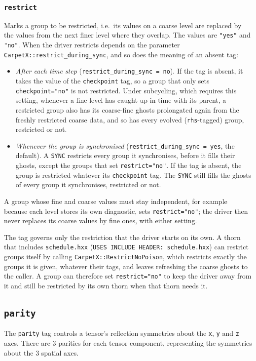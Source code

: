 \subsubsection{\texttt{restrict}}

Marks a group to be restricted, i.e.\ its values on a coarse level are replaced by the values from the next finer level where they overlap. The values are \texttt{"yes"} and \texttt{"no"}. When the driver restricts depends on the parameter \texttt{CarpetX::restrict\_during\_sync}, and so does the meaning of an absent tag:
%
\begin{itemize}
\item \emph{After each time step} (\texttt{restrict\_during\_sync = no}). If the tag is absent, it takes the value of the \texttt{checkpoint} tag, so a group that only sets \texttt{checkpoint="no"} is not restricted. Under subcycling, which requires this setting, whenever a fine level has caught up in time with its parent, a restricted group also has its coarse-fine ghosts prolongated again from the freshly restricted coarse data, and so has every evolved (\texttt{rhs}-tagged) group, restricted or not.
\item \emph{Whenever the group is synchronised} (\texttt{restrict\_during\_sync = yes}, the default). A \texttt{SYNC} restricts every group it synchronises, before it fills their ghosts, except the groups that set \texttt{restrict="no"}. If the tag is absent, the group is restricted whatever its \texttt{checkpoint} tag. The \texttt{SYNC} still fills the ghosts of every group it synchronises, restricted or not.
\end{itemize}
%
A group whose fine and coarse values must stay independent, for example because each level stores its own diagnostic, sets \texttt{restrict="no"}; the driver then never replaces its coarse values by fine ones, with either setting.

The tag governs only the restriction that the driver starts on its own. A thorn that includes \texttt{schedule.hxx} (\texttt{USES INCLUDE HEADER: schedule.hxx}) can restrict groups itself by calling \texttt{CarpetX::RestrictNoPoison}, which restricts exactly the groups it is given, whatever their tags, and leaves refreshing the coarse ghosts to the caller. A group can therefore set \texttt{restrict="no"} to keep the driver away from it and still be restricted by its own thorn when that thorn needs it.

\subsection{\texttt{parity}}
The \texttt{parity} tag controls a tensor's reflection symmetries about the \texttt{x}, \texttt{y} and \texttt{z} axes. There are 3 parities for each tensor component, representing the symmetries about the 3 spatial axes.

